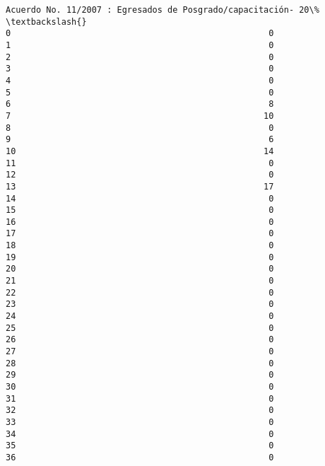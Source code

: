 \documentclass[11pt]{article}
\begin{document}
\begin{Verbatim}[commandchars=\\\{\}]
    Acuerdo No. 11/2007 : Egresados de Posgrado/capacitación- 20\%  \textbackslash{}
0                                                   0               
1                                                   0               
2                                                   0               
3                                                   0               
4                                                   0               
5                                                   0               
6                                                   8               
7                                                  10               
8                                                   0               
9                                                   6               
10                                                 14               
11                                                  0               
12                                                  0               
13                                                 17               
14                                                  0               
15                                                  0               
16                                                  0               
17                                                  0               
18                                                  0               
19                                                  0               
20                                                  0               
21                                                  0               
22                                                  0               
23                                                  0               
24                                                  0               
25                                                  0               
26                                                  0               
27                                                  0               
28                                                  0               
29                                                  0               
30                                                  0               
31                                                  0               
32                                                  0               
33                                                  0               
34                                                  0               
35                                                  0               
36                                                  0               

\end{Verbatim}
\end{document}
